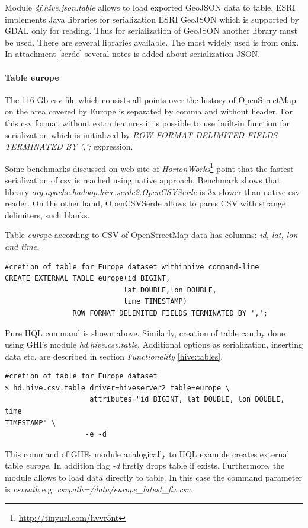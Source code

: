 \documentclass[a4paper,12pt,oneside]{report}
\begin{document}
	
		Module \textit{df.hive.json.table} allows to load exported GeoJSON data to
	table. ESRI implements Java libraries for serialization ESRI GeoJSON which is
	supported by GDAL only for reading. Thus for serialization of GeoJSON another library must be
	used. There are several libraries available. The most widely used is
	from onix. In attachment \ref{serde} several notes is added about serialization
	JSON.

\paragraph{Table europe}
		The 116 Gb csv file which consists all points over the history of OpenStreetMap on the area covered by Europe is separated by comma and without header. For this csv
	format without extra features it is possible to use built-in function for
	serialization which is initialized by \textit{ROW FORMAT DELIMITED FIELDS
	TERMINATED BY ',';} expression.
		
	Some benchmarks discussed on web site of
	\textit{HortonWorks}\footnote{\url{http://tinyurl.com/hvvr5nt}} point that the fastest serialization of csv is reached using native approach. Benchmark shows
	that library \textit{org.apache.hadoop.hive.serde2.OpenCSVSerde} is 3x slower
	than native csv reader. On the other hand, OpenCSVSerde allows to pares CSV with
	strange delimiters, such blanks.
		
		
	Table \textit{euro}pe according to CSV of OpenStreetMap data has columns: \textit{id, lat, lon
and time.}
\begin{footnotesize}
	\begin{lstlisting}[style=python]
#cretion of table for Europe dataset withinhive command-line
CREATE EXTERNAL TABLE europe(id BIGINT,
                            lat DOUBLE,lon DOUBLE,
                            time TIMESTAMP)
			    ROW FORMAT DELIMITED FIELDS TERMINATED BY ',';
		\end{lstlisting}
	\end{footnotesize}
	Pure HQL command is shown above. Similarly, creation of table can by done using GHFs
	module \textit{hd.hive.csv.table}. Additional options as serialization,
	inserting data etc. are described in section
	\textit{Functionality} \ref{hive:tables}. 
\begin{footnotesize}
	\begin{lstlisting}[style=python]
#cretion of table for Europe dataset
$ hd.hive.csv.table driver=hiveserver2 table=europe \
                    attributes="id BIGINT, lat DOUBLE, lon DOUBLE, time
TIMESTAMP" \
                   -e -d
		\end{lstlisting}
	\end{footnotesize}
	This command of GHFs module analogically to HQL example creates external table
	\textit{europe}. In addition flag \textit{-d} firstly drops table if exists.
	Furthermore, the module allows to load data directly to table. In this case the
	command parameter is \textit{csvpath} e.g.
	\textit{csvpath=/data/europe\_latest\_fix.csv}.
	
\end{document}
